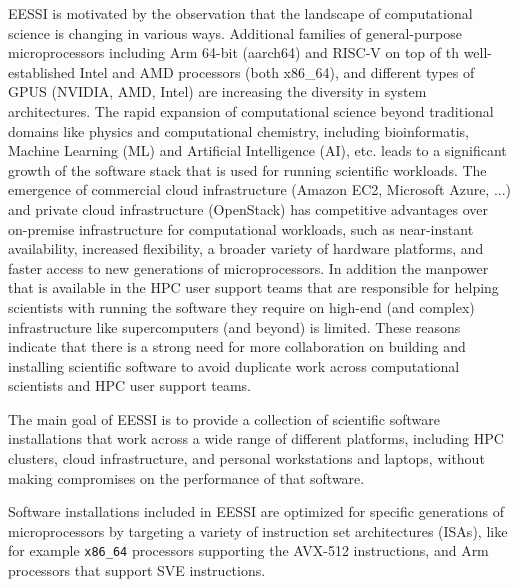 EESSI is motivated by the observation that the landscape of computational science is changing in various ways.
Additional families of general-purpose microprocessors including Arm 64-bit (aarch64) and RISC-V on top of th
well-established Intel and AMD processors (both x86\_64), and different types of GPUS (NVIDIA, AMD, Intel) are
increasing the diversity in system architectures. The rapid expansion of computational science beyond traditional
domains like physics and computational chemistry, including bioinformatis, Machine Learning (ML) and Artificial
Intelligence (AI), etc. leads to a significant growth of the software stack that is used for running scientific
workloads. The emergence of commercial cloud infrastructure (Amazon EC2, Microsoft Azure, ...) and private cloud
infrastructure (OpenStack) has competitive advantages over on-premise infrastructure for computational workloads, such
as near-instant availability, increased flexibility, a broader variety of hardware platforms, and faster access to new
generations of microprocessors. In addition the manpower that is available in the HPC user support teams that are
responsible for helping scientists with running the software they require on high-end (and complex) infrastructure like
supercomputers (and beyond) is limited. These reasons indicate that there is a strong need for more collaboration on
building and installing scientific software to avoid duplicate work across computational scientists and HPC user support
teams.

The main goal of EESSI is to provide a collection of scientific software installations that work across a wide range of
different platforms, including HPC clusters, cloud infrastructure, and personal workstations and laptops, without making
compromises on the performance of that software.

Software installations included in EESSI are optimized for specific generations of microprocessors by targeting a
variety of instruction set architectures (ISAs), like for example \texttt{x86\_64} processors supporting the
AVX-512 instructions, and Arm processors that support SVE instructions.

